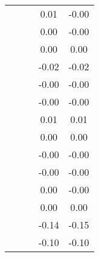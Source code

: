 \begin{table}
\begin{tabular}{c|cc|cc|}
\multicolumn{1}{|c|}{} & \multicolumn{1}{|c|}{} & \multicolumn{1}{|c|}{} & \multicolumn{1}{|c|}{      0.01} & \multicolumn{1}{|c|}{     -0.00} \\ 
\multicolumn{1}{|c|}{} & \multicolumn{1}{|c|}{} & \multicolumn{1}{|c|}{} & \multicolumn{1}{|c|}{      0.00} & \multicolumn{1}{|c|}{     -0.00} \\ 
\multicolumn{1}{|c|}{} & \multicolumn{1}{|c|}{} & \multicolumn{1}{|c|}{} & \multicolumn{1}{|c|}{      0.00} & \multicolumn{1}{|c|}{      0.00} \\ 
\multicolumn{1}{|c|}{} & \multicolumn{1}{|c|}{} & \multicolumn{1}{|c|}{} & \multicolumn{1}{|c|}{     -0.02} & \multicolumn{1}{|c|}{     -0.02} \\ 
\multicolumn{1}{|c|}{} & \multicolumn{1}{|c|}{} & \multicolumn{1}{|c|}{} & \multicolumn{1}{|c|}{     -0.00} & \multicolumn{1}{|c|}{     -0.00} \\ 
\multicolumn{1}{|c|}{} & \multicolumn{1}{|c|}{} & \multicolumn{1}{|c|}{} & \multicolumn{1}{|c|}{     -0.00} & \multicolumn{1}{|c|}{     -0.00} \\ 
\multicolumn{1}{|c|}{} & \multicolumn{1}{|c|}{} & \multicolumn{1}{|c|}{} & \multicolumn{1}{|c|}{      0.01} & \multicolumn{1}{|c|}{      0.01} \\ 
\multicolumn{1}{|c|}{} & \multicolumn{1}{|c|}{} & \multicolumn{1}{|c|}{} & \multicolumn{1}{|c|}{      0.00} & \multicolumn{1}{|c|}{      0.00} \\ 
\multicolumn{1}{|c|}{} & \multicolumn{1}{|c|}{} & \multicolumn{1}{|c|}{} & \multicolumn{1}{|c|}{     -0.00} & \multicolumn{1}{|c|}{     -0.00} \\ 
\multicolumn{1}{|c|}{} & \multicolumn{1}{|c|}{} & \multicolumn{1}{|c|}{} & \multicolumn{1}{|c|}{     -0.00} & \multicolumn{1}{|c|}{     -0.00} \\ 
\multicolumn{1}{|c|}{} & \multicolumn{1}{|c|}{} & \multicolumn{1}{|c|}{} & \multicolumn{1}{|c|}{      0.00} & \multicolumn{1}{|c|}{     -0.00} \\ 
\multicolumn{1}{|c|}{} & \multicolumn{1}{|c|}{} & \multicolumn{1}{|c|}{} & \multicolumn{1}{|c|}{      0.00} & \multicolumn{1}{|c|}{      0.00} \\ 
\multicolumn{1}{|c|}{} & \multicolumn{1}{|c|}{} & \multicolumn{1}{|c|}{} & \multicolumn{1}{|c|}{     -0.14} & \multicolumn{1}{|c|}{     -0.15} \\ 
\multicolumn{1}{|c|}{} & \multicolumn{1}{|c|}{} & \multicolumn{1}{|c|}{} & \multicolumn{1}{|c|}{     -0.10} & \multicolumn{1}{|c|}{     -0.10} \\ 

\end{tabular}
\end{table}
